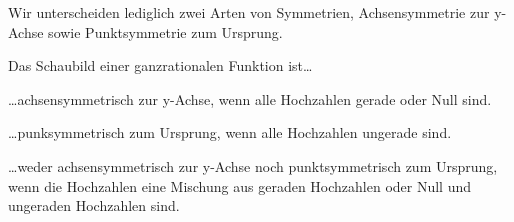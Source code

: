 Wir unterscheiden lediglich zwei Arten von Symmetrien, Achsensymmetrie zur y-Achse sowie Punktsymmetrie zum Ursprung.
\begin{tcolorbox}\centering
	\textcolor{loestc}{Das Schaubild einer ganzrationalen Funktion ist\dots}
		
	\textcolor{loestc}{\dots achsensymmetrisch zur y-Achse, wenn alle Hochzahlen gerade oder Null sind.}
		
	\textcolor{loestc}{\dots punksymmetrisch zum Ursprung, wenn alle Hochzahlen ungerade sind.}
		
	\textcolor{loestc}{\dots weder achsensymmetrisch zur y-Achse noch punktsymmetrisch zum Ursprung, wenn die Hochzahlen eine Mischung aus geraden Hochzahlen oder Null und ungeraden Hochzahlen sind.}
\end{tcolorbox}
